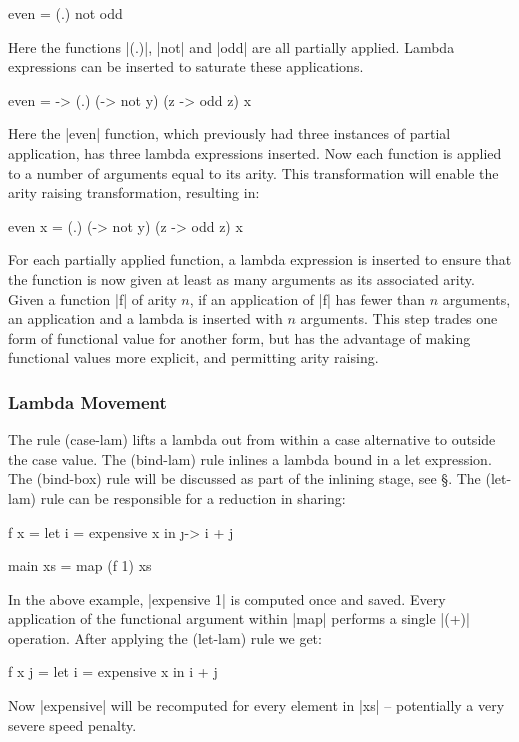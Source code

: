 \documentclass[preprint]{sigplanconf}
\begin{document}
\begin{example}
\begin{code}
even = (.) not odd
\end{code}

Here the functions |(.)|, |not| and |odd| are all partially applied. Lambda expressions can be inserted to saturate these applications.

\begin{code}
even = \x -> (.) (\y -> not y) (z -> odd z) x
\end{code}

Here the |even| function, which previously had three instances of partial application, has three lambda expressions inserted. Now each function is applied to a number of arguments equal to its arity. This transformation will enable the arity raising transformation, resulting in:

\begin{code}
even x = (.) (\y -> not y) (z -> odd z) x
\end{code}
\end{example}

For each partially applied function, a lambda expression is inserted to ensure that the function is now given at least as many arguments as its associated arity. Given a function |f| of arity $n$, if an application of |f| has fewer than $n$ arguments, an application and a lambda is inserted with $n$ arguments. This step trades one form of functional value for another form, but has the advantage of making functional values more explicit, and permitting arity raising.

\subsubsection{Lambda Movement}
\label{sec:sharing}

The rule (case-lam) lifts a lambda out from within a case alternative to outside the case value. The (bind-lam) rule inlines a lambda bound in a let expression. The (bind-box) rule will be discussed as part of the inlining stage, see \S\label{sec:inlining}. The (let-lam) rule can be responsible for a reduction in sharing:

\begin{example}
\begin{code}
f x = let i = expensive x
      in \j -> i + j

main xs = map (f 1) xs
\end{code}

In the above example, |expensive 1| is computed once and saved. Every application of the functional argument within |map| performs a single |(+)| operation. After applying the (let-lam) rule we get:

\begin{code}
f x j = let i = expensive x
        in i + j
\end{code}

Now |expensive| will be recomputed for every element in |xs| -- potentially a very severe speed penalty.
\end{example}
\end{document}
